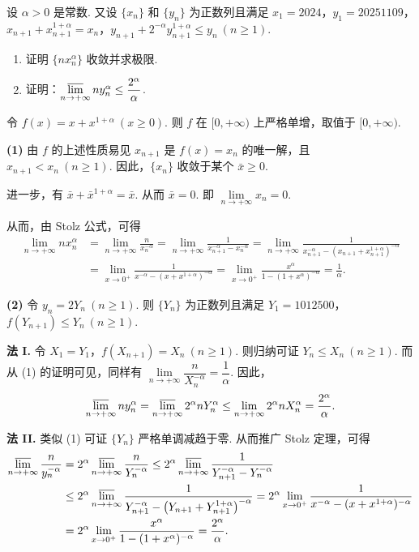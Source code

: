 设 $\alpha>0$ 是常数. 又设 $\{x_n\}$ 和 $\{y_n\}$ 为正数列且满足 $x_1=2024$，$y_1=20251109$，$x_{n+1}+x_{n+1}^{1+\alpha}=x_n$，$y_{n+1}+2^{-\alpha}y_{n+1}^{1+\alpha}\le y_n\ (n\ge1)$.
\begin{enumerate}[label=(\arabic*)]
  \item 证明 $\{nx_n^{\alpha}\}$ 收敛并求极限.
  \item 证明：$\varlimsup\limits_{n\to+\infty}ny_n^{\alpha}\le\dfrac{2^{\alpha}}{\alpha}$.
\end{enumerate}
\begin{solution}
令 $f(x)=x+x^{1+\alpha}\ (x\ge0)$. 则 $f$ 在 $[0,+\infty)$ 上严格单增，取值于 $[0,+\infty)$.

\textbf{(1)} 由 $f$ 的上述性质易见 $x_{n+1}$ 是 $f(x)=x_n$ 的唯一解，且 $x_{n+1}<x_n\ (n\ge1)$. 因此，$\{x_n\}$ 收敛于某个 $\bar{x}\ge0$.

进一步，有 $\bar{x}+\bar{x}^{1+\alpha}=\bar{x}$. 从而 $\bar{x}=0$. 即 $\lim\limits_{n\to+\infty}x_n=0$.

从而，由 Stolz 公式，可得
\begin{align*}
\lim_{n\to+\infty}nx_n^{\alpha}&=\lim_{n\to+\infty}\frac{n}{x_n^{-\alpha}}=\lim_{n\to+\infty}\frac{1}{x_{n+1}^{-\alpha}-x_n^{-\alpha}}=\lim_{n\to+\infty}\frac{1}{x_{n+1}^{-\alpha}-\left(x_{n+1}+x_{n+1}^{1+\alpha}\right)^{-\alpha}}\\
&=\lim_{x\to0^+}\frac{1}{x^{-\alpha}-(x+x^{1+\alpha})^{-\alpha}}=\lim_{x\to0^+}\frac{x^{\alpha}}{1-(1+x^{\alpha})^{-\alpha}}=\frac{1}{\alpha}.
\end{align*}

\textbf{(2)} 令 $y_n=2Y_n\ (n\ge1)$. 则 $\{Y_n\}$ 为正数列且满足 $Y_1=1012500$，$f(Y_{n+1})\le Y_n\ (n\ge1)$.

\textbf{法 I.} 令 $X_1=Y_1$，$f(X_{n+1})=X_n\ (n\ge1)$. 则归纳可证 $Y_n\le X_n\ (n\ge1)$. 而从 (1) 的证明可见，同样有 $\lim\limits_{n\to+\infty}\dfrac{n}{X_n^{-\alpha}}=\dfrac{1}{\alpha}$. 因此，
\begin{align*}
\varlimsup_{n\to+\infty}ny_n^{\alpha}=\varlimsup_{n\to+\infty}2^{\alpha}nY_n^{\alpha}\le\lim_{n\to+\infty}2^{\alpha}nX_n^{\alpha}=\frac{2^{\alpha}}{\alpha}.
\end{align*}

\textbf{法 II.} 类似 (1) 可证 $\{Y_n\}$ 严格单调减趋于零. 从而推广 Stolz 定理，可得
\begin{align*}
\varlimsup_{n\to+\infty}\frac{n}{y_n^{-\alpha}}&=2^{\alpha}\varlimsup_{n\to+\infty}\frac{n}{Y_n^{-\alpha}}\le2^{\alpha}\varlimsup_{n\to+\infty}\frac{1}{Y_{n+1}^{-\alpha}-Y_n^{-\alpha}}\\
&\le2^{\alpha}\varlimsup_{n\to+\infty}\frac{1}{Y_{n+1}^{-\alpha}-\left(Y_{n+1}+Y_{n+1}^{1+\alpha}\right)^{-\alpha}}=2^{\alpha}\lim_{x\to0^+}\frac{1}{x^{-\alpha}-(x+x^{1+\alpha})^{-\alpha}}\\
&=2^{\alpha}\lim_{x\to0^+}\frac{x^{\alpha}}{1-(1+x^{\alpha})^{-\alpha}}=\frac{2^{\alpha}}{\alpha}.
\end{align*}
\end{solution}
